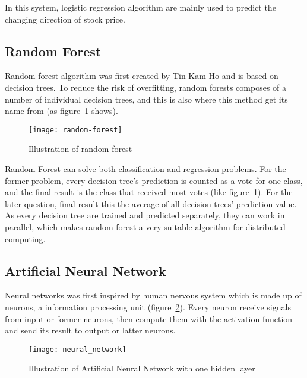In this system, logistic regression algorithm are mainly used to predict the changing direction of stock price.

\subsection{Random Forest}
Random forest algorithm was first created by Tin Kam Ho\cite{ho1995random} and is based on decision trees. To reduce the risk of overfitting, random forests composes of a number of individual decision trees, and this is also where this method get its name from (as figure~\ref{fg:decision-tree} shows).
\begin{figure}[h]
	\centering
	\texttt{[image: random-forest]}
	\caption{Illustration of random forest}
	\label{fg:decision-tree}
\end{figure}

Random Forest can solve both classification and regression problems. For the former problem, every decision tree's prediction is counted as a vote for one class, and the final result is the class that received most votes (like figure~\ref{fg:decision-tree}). For the later question, final result this the average of all decision trees' prediction value.\\


As every decision tree are trained and predicted separately, they can work in parallel, which makes random forest a very suitable algorithm for distributed computing.


\subsection{Artificial Neural Network}
Neural networks was first inspired by human nervous system which is made up of neurons, a information processing unit (figure~\ref{fg:neural-nework}). Every neuron receive signals from input or former neurons, then compute them with the activation function and send its result to output or latter neurons\cite{russell2003artificial}.
\begin{figure}[h]
	\centering
	\texttt{[image: neural\_network]}
	\caption{Illustration of Artificial Neural Network with one hidden layer}
	\label{fg:neural-nework}
\end{figure}

